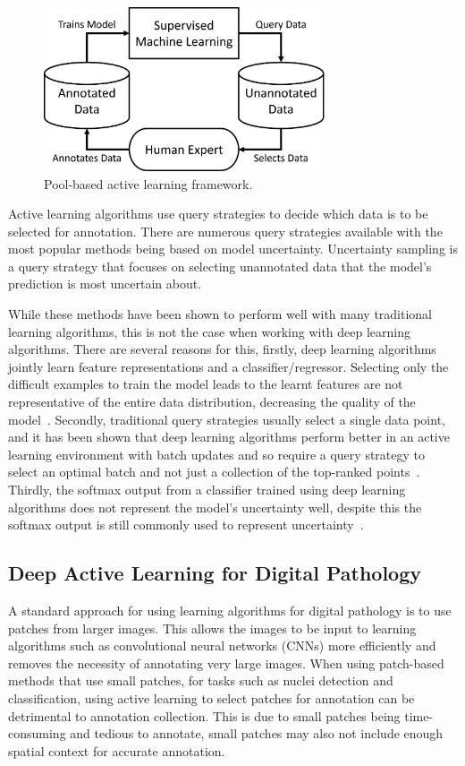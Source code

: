 \begin{figure}[h]
	\centering
	\includegraphics[width=0.75\textwidth]{images/active_learning.png}
	\caption{Pool-based active learning framework.}
	\label{fig:pool_based_active_learning}
\end{figure}

Active learning algorithms use query strategies to decide which data is to be selected for annotation. There are numerous query strategies available with the most popular methods being based on model uncertainty. Uncertainty sampling is a query strategy that focuses on selecting unannotated data that the model’s prediction is most uncertain about.

While these methods have been shown to perform well with many traditional learning algorithms, this is not the case when working with deep learning algorithms. There are several reasons for this, firstly, deep learning algorithms jointly learn feature representations and a classifier/regressor. Selecting only the difficult examples to train the model leads to the learnt features are not representative of the entire data distribution, decreasing the quality of the model~\citep{wang2016cost}. Secondly, traditional query strategies usually select a single data point, and it has been shown that deep learning algorithms perform better in an active learning environment with batch updates and so require a query strategy to select an optimal batch and not just a collection of the top-ranked points~\citep{sener2017active}. Thirdly, the softmax output from a classifier trained using deep learning algorithms does not represent the model’s uncertainty well, despite this the softmax output is still commonly used to represent uncertainty~\citep{gal2016dropout}.

\subsection{Deep Active Learning for Digital Pathology}
\label{subsec:active_deep_learning}
A standard approach for using learning algorithms for digital pathology is to use patches from larger images. This allows the images to be input to learning algorithms such as convolutional neural networks (CNNs) more efficiently and removes the necessity of annotating very large images. When using patch-based methods that use small patches, for tasks such as nuclei detection and classification, using active learning to select patches for annotation can be detrimental to annotation collection. This is due to small patches being time-consuming and tedious to annotate, small patches may also not include enough spatial context for accurate annotation.

